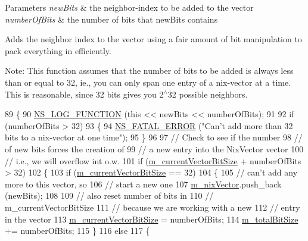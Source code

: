 \begin{DoxyParams}{Parameters}
{\em new\+Bits} & the neighbor-\/index to be added to the vector \\
\hline
{\em number\+Of\+Bits} & the number of bits that new\+Bits contains\\
\hline
\end{DoxyParams}
Adds the neighbor index to the vector using a fair amount of bit manipulation to pack everything in efficiently.

Note\+: This function assumes that the number of bits to be added is always less than or equal to 32, ie., you can only span one entry of a nix-\/vector at a time. This is reasonable, since 32 bits gives you 2$^\wedge$32 possible neighbors. 
\begin{DoxyCode}
89 \{
90   \hyperlink{log-macros-disabled_8h_a90b90d5bad1f39cb1b64923ea94c0761}{NS\_LOG\_FUNCTION} (\textcolor{keyword}{this} << newBits << numberOfBits);
91 
92   \textcolor{keywordflow}{if} (numberOfBits > 32)
93     \{
94       \hyperlink{group__fatal_ga5131d5e3f75d7d4cbfd706ac456fdc85}{NS\_FATAL\_ERROR} (\textcolor{stringliteral}{"Can't add more than 32 bits to a nix-vector at one time"});
95     \}
96 
97   \textcolor{comment}{// Check to see if the number}
98   \textcolor{comment}{// of new bits forces the creation of }
99   \textcolor{comment}{// a new entry into the NixVector vector}
100   \textcolor{comment}{// i.e., we will overflow int o.w.}
101   \textcolor{keywordflow}{if} (\hyperlink{classns3_1_1NixVector_ad2514d7b869b341fbe23f5cd54d92f58}{m\_currentVectorBitSize} + numberOfBits > 32) 
102     \{
103       \textcolor{keywordflow}{if} (\hyperlink{classns3_1_1NixVector_ad2514d7b869b341fbe23f5cd54d92f58}{m\_currentVectorBitSize} == 32)
104         \{
105           \textcolor{comment}{// can't add any more to this vector, so }
106           \textcolor{comment}{// start a new one}
107           \hyperlink{classns3_1_1NixVector_a8e3d193156da514255bb033ceb8500df}{m\_nixVector}.push\_back (newBits);
108 
109           \textcolor{comment}{// also reset number of bits in}
110           \textcolor{comment}{// m\_currentVectorBitSize}
111           \textcolor{comment}{// because we are working with a new }
112           \textcolor{comment}{// entry in the vector}
113           \hyperlink{classns3_1_1NixVector_ad2514d7b869b341fbe23f5cd54d92f58}{m\_currentVectorBitSize} = numberOfBits;
114           \hyperlink{classns3_1_1NixVector_a7a49e3aa07e9d0d45fd509dc5f95857a}{m\_totalBitSize} += numberOfBits;
115         \}
116       \textcolor{keywordflow}{else}
117         \{

\end{DoxyCode}
